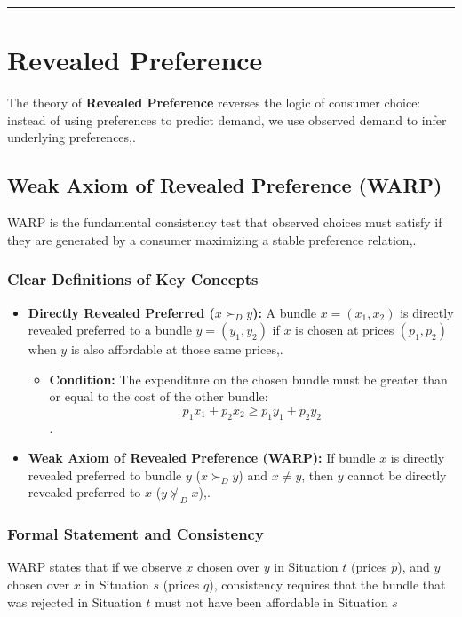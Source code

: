 \documentclass{article}
\begin{document}
\hrule
\pagebreak
\section{Revealed Preference}

The theory of \textbf{Revealed Preference} reverses the logic of consumer choice: instead of using preferences to predict demand, we use observed demand to infer underlying preferences,.

\subsection{Weak Axiom of Revealed Preference (WARP)}

WARP is the fundamental consistency test that observed choices must satisfy if they are generated by a consumer maximizing a stable preference relation,.

\subsubsection*{Clear Definitions of Key Concepts}
\begin{itemize}
    \item \textbf{Directly Revealed Preferred ($x \succ_D y$):} A bundle $x = (x_1, x_2)$ is directly revealed preferred to a bundle $y = (y_1, y_2)$ if $x$ is chosen at prices $(p_1, p_2)$ when $y$ is also affordable at those same prices,.
    \begin{itemize}
        \item \textbf{Condition:} The expenditure on the chosen bundle must be greater than or equal to the cost of the other bundle: \[p_1 x_1 + p_2 x_2 \geq p_1 y_1 + p_2 y_2\].
    \end{itemize}
    \item \textbf{Weak Axiom of Revealed Preference (WARP):} If bundle $x$ is directly revealed preferred to bundle $y$ ($x \succ_D y$) and $x \neq y$, then $y$ cannot be directly revealed preferred to $x$ ($y \not\succ_D x$),.
\end{itemize}

\subsubsection*{Formal Statement and Consistency}

WARP states that if we observe $x$ chosen over $y$ in Situation $t$ (prices $p$), and $y$ chosen over $x$ in Situation $s$ (prices $q$), consistency requires that the bundle that was rejected in Situation $t$ must not have been affordable in Situation $s$
\end{document}
